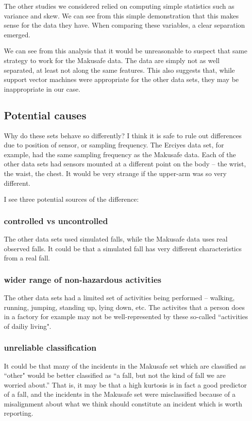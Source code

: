 \documentclass{article}
\begin{document}
The other studies we considered relied on computing simple statistics such as variance and skew. We can see from this simple demonstration that this makes sense for the data they have. When comparing these variables, a clear separation emerged.

We can see from this analysis that it would be unreasonable to suspect that same strategy to work for the Makusafe data. The data are simply not as well separated, at least not along the same features. This also suggests that, while support vector machines were appropriate for the other data sets, they may be inappropriate in our case.

\subsection{Potential causes}

Why do these sets behave so differently? I think it is safe to rule out differences due to position of sensor, or sampling frequency. The Erciyes data set, for example, had the same sampling frequency as the Makusafe data. Each of the other data sets had sensors mounted at a different point on the body -- the wrist, the waist, the chest. It would be very strange if the upper-arm was so very different.

I see three potential sources of the difference:
\subsubsection{controlled vs uncontrolled}
The other data sets used simulated falls, while the Makusafe data uses real observed falls. It could be that a simulated fall has very different characteristics from a real fall.

\subsubsection{wider range of non-hazardous activities}
The other data sets had a limited set of activities being performed -- walking, running, jumping, standing up, lying down, etc. The activites that a person does in a factory for example may not be well-represented by these so-called ``activities of dailiy living".

\subsubsection{unreliable classification}
It could be that many of the incidents in the Makusafe set which are classified as ``other" would be better classified as ``a fall, but not the kind of fall we are worried about.'' That is, it may be that a high kurtosis is in fact a good predictor of a fall, and the incidents in the Makusafe set were misclassified because of a misalignment about what we think should constitute an incident which is worth reporting.
\end{document}
